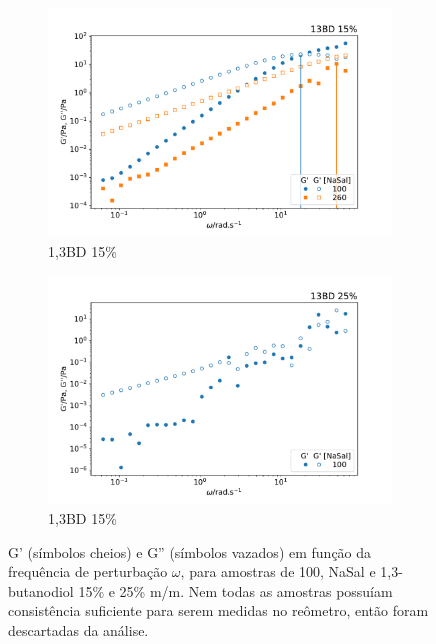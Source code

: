 	\begin{figure}[h]
		\begin{subfigure}[t]{0.5\textwidth}
			\centering
			\includegraphics[width=\textwidth]{imagens/reologia/oscilatorio_13bd15p}
			\caption{1,3BD 15\%}
			\label{fig:oscilatorio_13bd_15p}
		\end{subfigure} %
		\begin{subfigure}[t]{0.5\textwidth}
			\centering
			\includegraphics[width=\textwidth]{imagens/reologia/oscilatorio_13bd25p}
			\caption{1,3BD 15\%}
			\label{fig:oscilatorio_13bd_25p}
		\end{subfigure} %
		\caption{G' (símbolos cheios) e G'' (símbolos vazados) em função da frequência de perturbação \(\omega\), para amostras de \CTAB{} 100\mM{}, NaSal e 1,3-butanodiol 15\% e 25\% m/m. Nem todas as amostras possuíam consistência suficiente para serem medidas no reômetro, então foram descartadas da análise.}
		\label{fig:oscilatorio_13bd}
	\end{figure}

